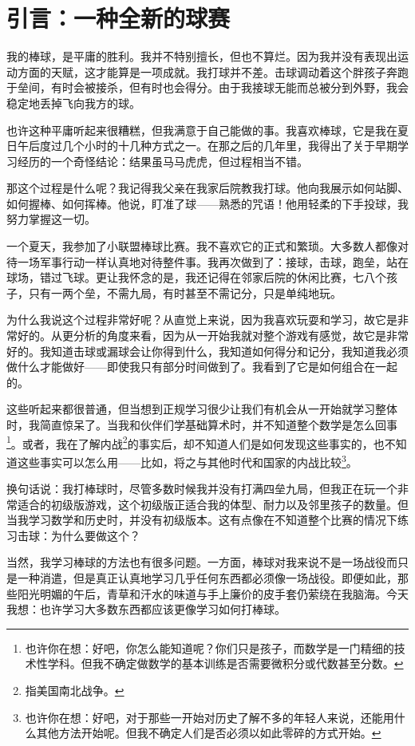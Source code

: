 \chapter*{引言：一种全新的球赛}
我的棒球，是平庸的胜利。我并不特别擅长，但也不算烂。因为我并没有表现出运动方面的天赋，这才能算是一项成就。我打球并不差。击球调动着这个胖孩子奔跑于垒间，有时会被接杀，但有时也会得分。由于我接球无能而总被分到外野，我会稳定地丢掉飞向我方的球。

也许这种平庸听起来很糟糕，但我满意于自己能做的事。我喜欢棒球，它是我在夏日午后度过几个小时的十几种方式之一。在那之后的几年里，我得出了关于早期学习经历的一个奇怪结论：结果虽马马虎虎，但过程相当不错。

那这个过程是什么呢？我记得我父亲在我家后院教我打球。他向我展示如何站脚、如何握棒、如何挥棒。他说，盯准了球——熟悉的咒语！他用轻柔的下手投球，我努力掌握这一切。

一个夏天，我参加了小联盟棒球比赛。我不喜欢它的正式和繁琐。大多数人都像对待一场军事行动一样认真地对待整件事。我再次做到了：接球，击球，跑垒，站在球场，错过飞球。更让我怀念的是，我还记得在邻家后院的休闲比赛，七八个孩子，只有一两个垒，不需九局，有时甚至不需记分，只是单纯地玩。

为什么我说这个过程非常好呢？从直觉上来说，因为我喜欢玩耍和学习，故它是非常好的。从更分析的角度来看，因为从一开始我就对整个游戏有感觉，故它是非常好的。我知道击球或漏球会让你得到什么，我知道如何得分和记分，我知道我必须做什么才能做好——即使我只有部分时间做到了。我看到了它是如何组合在一起的。

这些听起来都很普通，但当想到正规学习很少让我们有机会从一开始就学习整体时，我简直惊呆了。当我和伙伴们学基础算术时，并不知道整个数学是怎么回事\footnote{也许你在想：好吧，你怎么能知道呢？你们只是孩子，而数学是一门精细的技术性学科。但我不确定做数学的基本训练是否需要微积分或代数甚至分数。}。或者，我在了解内战\footnote{指美国南北战争。}的事实后，却不知道人们是如何发现这些事实的，也不知道这些事实可以怎么用——比如，将之与其他时代和国家的内战比较\footnote{也许你在想：好吧，对于那些一开始对历史了解不多的年轻人来说，还能用什么其他方法开始呢。但我不确定人们是否必须以如此零碎的方式开始。}。

换句话说：我打棒球时，尽管多数时候我并没有打满四垒九局，但我正在玩一个非常适合的初级版游戏，这个初级版正适合我的体型、耐力以及邻里孩子的数量。但当我学习数学和历史时，并没有初级版本。这有点像在不知道整个比赛的情况下练习击球：为什么要做这个？

当然，我学习棒球的方法也有很多问题。一方面，棒球对我来说不是一场战役而只是一种消遣，但是真正认真地学习几乎任何东西都必须像一场战役。即便如此，那些阳光明媚的午后，青草和汗水的味道与手上廉价的皮手套仍萦绕在我脑海。今天我想：也许学习大多数东西都应该更像学习如何打棒球。

